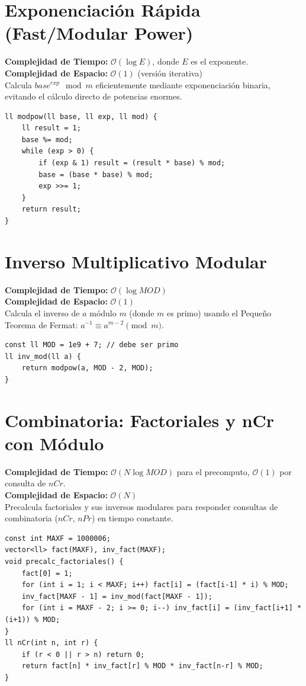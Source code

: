 \documentclass[10pt,twocolumn,letterpaper]{report}
\begin{document}
\section{Exponenciación Rápida (Fast/Modular Power)}
\textbf{Complejidad de Tiempo:} $\mathcal{O}(\log E)$, donde $E$ es el exponente. \\
\textbf{Complejidad de Espacio:} $\mathcal{O}(1)$ (versión iterativa) \\
Calcula $base^{exp} \mod m$ eficientemente mediante exponenciación binaria, evitando el cálculo directo de potencias enormes.
\begin{lstlisting}
ll modpow(ll base, ll exp, ll mod) {
    ll result = 1;
    base %= mod;
    while (exp > 0) {
        if (exp & 1) result = (result * base) % mod;
        base = (base * base) % mod;
        exp >>= 1;
    }
    return result;
}
\end{lstlisting}
\section{Inverso Multiplicativo Modular}
\textbf{Complejidad de Tiempo:} $\mathcal{O}(\log MOD)$ \\
\textbf{Complejidad de Espacio:} $\mathcal{O}(1)$ \\
Calcula el inverso de $a$ módulo $m$ (donde $m$ es primo) usando el Pequeño Teorema de Fermat: $a^{-1} \equiv a^{m-2} \pmod{m}$.
\begin{lstlisting}
const ll MOD = 1e9 + 7; // debe ser primo
ll inv_mod(ll a) {
    return modpow(a, MOD - 2, MOD);
}
\end{lstlisting}
\section{Combinatoria: Factoriales y nCr con Módulo}
\textbf{Complejidad de Tiempo:} $\mathcal{O}(N \log MOD)$ para el precomputo, $\mathcal{O}(1)$ por consulta de $nCr$. \\
\textbf{Complejidad de Espacio:} $\mathcal{O}(N)$ \\
Precalcula factoriales y sus inversos modulares para responder consultas de combinatoria ($nCr$, $nPr$) en tiempo constante.
\begin{lstlisting}
const int MAXF = 1000006;
vector<ll> fact(MAXF), inv_fact(MAXF);
void precalc_factoriales() {
    fact[0] = 1;
    for (int i = 1; i < MAXF; i++) fact[i] = (fact[i-1] * i) % MOD;
    inv_fact[MAXF - 1] = inv_mod(fact[MAXF - 1]);
    for (int i = MAXF - 2; i >= 0; i--) inv_fact[i] = (inv_fact[i+1] * (i+1)) % MOD;
}
ll nCr(int n, int r) {
    if (r < 0 || r > n) return 0;
    return fact[n] * inv_fact[r] % MOD * inv_fact[n-r] % MOD;
}
\end{lstlisting}
\end{document}
